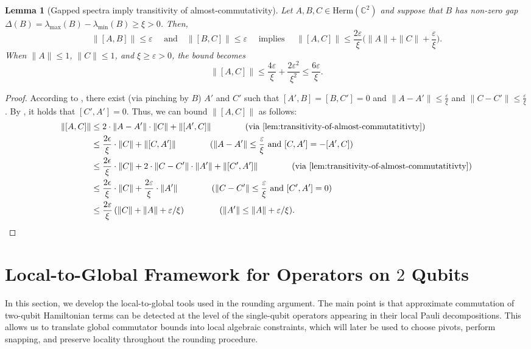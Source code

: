 \documentclass[a4paper,onecolumn,11pt]{quantumarticle}
\theoremstyle{plain}
\newtheorem{lemma}[theorem]{Lemma}
\newcommand{\eps}{\varepsilon}
\begin{document}
\begin{lemma}[Gapped spectra imply transitivity of almost-commutativity]\label{lem:transitivity-almost}
    Let $A,B,C \in \mathrm{Herm}(\mathbb{C}^{2})$ and suppose that $B$ has non-zero gap $\Delta(B)=\lambda_{\max}(B) - \lambda_{\min}(B) \geq \xi>0$. Then, 
$$
\|[A,B]\| \leq \eps \quad \text{ and} \quad \|[B,C]\| \leq \eps \quad \text{ implies } \quad \|[A,C]\| \leq \frac{2\eps}{\xi}\Big(\|A\| + \|C\| + \frac{\eps}{\xi} \Big) .
$$
When $\|A\|\leq 1$, $\|C\|\leq 1$, and $\xi \geq  \eps >0$, the bound becomes \[\|[A, C]\| \leq \frac{4\eps}{\xi} + \frac{2\eps^2}{\xi^2} \leq \frac{6\eps}{\xi}.\]
\end{lemma}
\begin{proof}
 According to , there exist (via pinching by $B$) $A'$ and $C'$ such that $[A', B] = [B, C'] = 0$ and $\|A - A'\| \leq \frac{\eps}{\xi}$ and $\|C - C'\| \leq \frac{\eps}{\xi}$. By , it holds that $[C', A'] = 0$. Thus, we can bound $\|[A, C]\|$ as follows:
    \begin{align*}
        \|[A,C]\| & \leq 2 \cdot \|A - A'\| \cdot \|C\| + \|[A', C]\| \qquad \qquad \text{(via \Cref{lem:transitivity-of-almost-commutatitivty})}\\
        &\leq \frac{2\epsilon}{\xi} \cdot \|C\| + \|[C, A']\| \qquad\qquad(\|A - A'\| \leq \frac{\eps}{\xi} \text{ and } [C,A'] = -[A',C])\\
        &\leq \frac{2\epsilon}{\xi} \cdot \|C\| + 2 \cdot \|C - C'\| \cdot \|A'\| + \|[C',A']\|  \qquad\qquad \text{(via \Cref{lem:transitivity-of-almost-commutatitivty})}\\
        & \leq \frac{2\epsilon}{\xi} \cdot \|C\| + \frac{2\eps}{\xi} \cdot \|A'\| \qquad \qquad (\|C - C'\| \leq \frac{\eps}{\xi} \text{ and } [C', A'] = 0)\\
        & \leq \frac{2\eps}{\xi} \left(\|C\| + \|A\| + \eps/\xi \right) \qquad  \qquad (\|A'\| \leq \|A\| + \eps/\xi).
    \end{align*}
\end{proof}

\section{Local-to-Global Framework for Operators on $2$ Qubits}

In this section, we develop the local-to-global tools used in the rounding
argument.  The main point is that approximate commutation of two-qubit
Hamiltonian terms can be detected at the level of the single-qubit
operators appearing in their local Pauli decompositions.  This allows us to
translate global commutator bounds into local algebraic constraints, which
will later be used to choose pivots, perform snapping, and preserve locality
throughout the rounding procedure.
\end{document}
